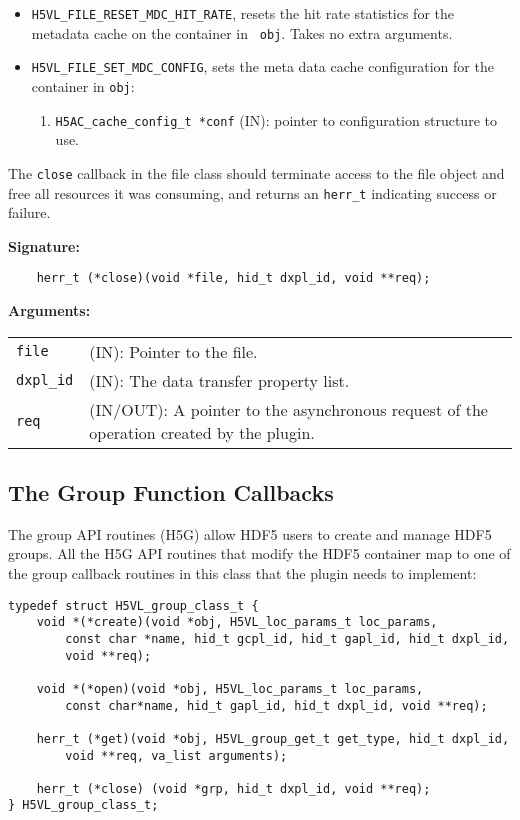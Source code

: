 \begin{itemize}
\item {\tt H5VL\_FILE\_RESET\_MDC\_HIT\_RATE}, resets the hit rate
  statistics for the metadata cache on the container in {\tt
    obj}. Takes no extra arguments.

\item {\tt H5VL\_FILE\_SET\_MDC\_CONFIG}, sets the meta data cache
  configuration for the container in {\tt obj}:
  \begin{enumerate}
  \item {\tt H5AC\_cache\_config\_t *conf} (IN): pointer to
    configuration structure to use.
  \end{enumerate}

\end{itemize}

The {\tt close} callback in the file class should terminate access to
the file object and free all resources it was consuming, and returns
an {\tt herr\_t} indicating success or failure.

\textbf{Signature:}
\begin{lstlisting}
    herr_t (*close)(void *file, hid_t dxpl_id, void **req);
\end{lstlisting}

\textbf{Arguments:}\\
\begin{tabular}{l p{10cm}}
  {\tt file} & (IN): Pointer to the file.\\
  {\tt dxpl\_id} & (IN): The data transfer property list.\\
  {\tt req} & (IN/OUT): A pointer to the asynchronous request of the
  operation created by the plugin.\\
\end{tabular}

\subsection{The Group Function Callbacks}

The group API routines (H5G) allow HDF5 users to create and manage
HDF5 groups. All the H5G API routines that modify the HDF5 container
map to one of the group callback routines in this class that the
plugin needs to implement:

\begin{lstlisting}
typedef struct H5VL_group_class_t {
    void *(*create)(void *obj, H5VL_loc_params_t loc_params, 
        const char *name, hid_t gcpl_id, hid_t gapl_id, hid_t dxpl_id, 
        void **req);

    void *(*open)(void *obj, H5VL_loc_params_t loc_params, 
        const char*name, hid_t gapl_id, hid_t dxpl_id, void **req);

    herr_t (*get)(void *obj, H5VL_group_get_t get_type, hid_t dxpl_id, 
        void **req, va_list arguments);

    herr_t (*close) (void *grp, hid_t dxpl_id, void **req);
} H5VL_group_class_t;
\end{lstlisting}

